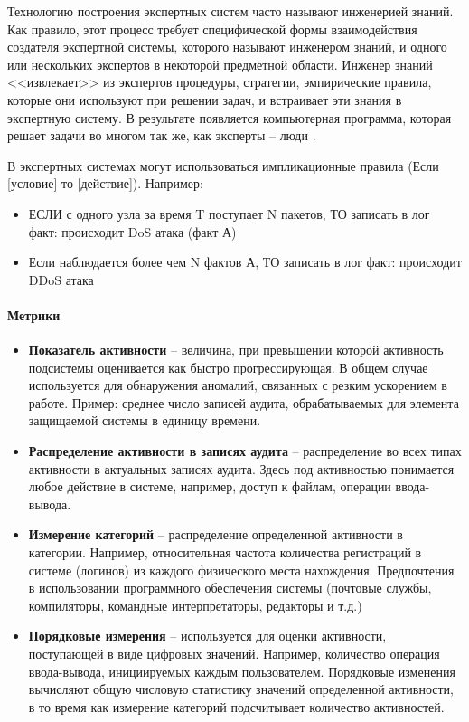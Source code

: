 Технологию построения экспертных систем часто называют инженерией знаний. Как правило, этот процесс требует специфической формы взаимодействия создателя экспертной системы, которого называют инженером знаний, и одного или нескольких экспертов в некоторой предметной области.  Инженер знаний <<извлекает>> из экспертов процедуры, стратегии,  эмпирические правила, которые они используют при решении задач, и  встраивает эти знания в экспертную систему. В результате появляется   компьютерная программа, которая решает задачи во многом так же, как   эксперты -- люди \autocite{ExpertSystems}.

В экспертных системах могут использоваться импликационные правила (Если [условие] то [действие]). Например:
\begin{itemize}
	\item ЕСЛИ с одного узла за время T поступает N пакетов, ТО записать в лог факт: происходит DoS атака (факт А)
	\item Если наблюдается более чем N фактов А, ТО записать в лог факт: происходит DDoS атака
\end{itemize}

\paragraph{Метрики}

\begin{itemize}
	\item \textbf{Показатель активности} -- величина, при превышении которой активность подсистемы оценивается как быстро прогрессирующая. В общем случае используется для обнаружения аномалий, связанных с резким ускорением в работе. Пример: среднее число записей аудита, обрабатываемых для элемента защищаемой системы в единицу времени.
	\item \textbf{Распределение активности в записях аудита} -- распределение во всех типах активности в актуальных записях аудита. Здесь под активностью понимается любое действие в системе, например, доступ к файлам, операции ввода-вывода.
	\item \textbf{Измерение категорий} -- распределение определенной активности в категории\footnotemark. Например, относительная частота количества регистраций в системе (логинов) из каждого физического места нахождения. Предпочтения в использовании программного обеспечения системы (почтовые службы, компиляторы, командные интерпретаторы, редакторы и т.д.)
	\item \textbf{Порядковые измерения} -- используется для оценки активности, поступающей в виде цифровых значений. Например, количество операция ввода-вывода, инициируемых каждым пользователем. Порядковые изменения вычисляют общую числовую статистику значений определенной активности, в то время как измерение категорий подсчитывает количество активностей.
\end{itemize}


